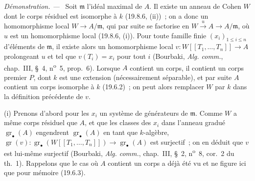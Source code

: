 \documentclass[10pt,oneside]{book}
\newcommand{\gr}{\operatorname{gr}}
\newenvironment{proof}{%
  \par\medskip\noindent\textit{Démonstration. ---\ }}{\par}
\begin{document}
\begin{proof}
Soit $\mathfrak m$ l'idéal maximal de $A$. Il existe un anneau de Cohen $W$ dont
le corps résiduel est isomorphe à $k$ (19.8.6, (ii))~; on a donc un
homomorphisme local $W\to A/\mathfrak m$, qui par suite se factorise en
$W\xrightarrow{u}A\to A/\mathfrak m$, où $u$ est un homomorphisme local
(19.8.6, (i)). Pour toute famille finie $(x_i)_{1\leq i\leq n}$ d'éléments de
$\mathfrak m$, il existe alors un homomorphisme local
$v:W[[T_1,\ldots,T_n]]\to A$ prolongeant $u$ et tel que $v(T_i)=x_i$ pour tout
$i$ (Bourbaki, \emph{Alg. comm.}, chap.~III, §~4, n\textsuperscript{o}~5,
prop.~6). Lorsque $A$ contient un corps, il contient un corps premier $P$, dont
$k$ est une extension (nécessairement séparable), et par suite $A$ contient un
corps isomorphe à $k$ (19.6.2)~; on peut alors remplacer $W$ par $k$ dans la
définition précédente de $v$.

\medskip
\noindent(i)\enspace
Prenons d'abord pour les $x_i$ un système de générateurs de $\mathfrak m$. Comme
$W$ a même corps résiduel que $A$, et que les classes des $x_i$ dans l'anneau
gradué $\gr_\bullet(A)$ engendrent $\gr_\bullet(A)$ en tant que $k$-algèbre,
$\gr(v):\gr_\bullet(W[[T_1,\ldots,T_n]])\to\gr_\bullet(A)$ est surjectif~; on
en déduit que $v$ est lui-même surjectif (Bourbaki, \emph{Alg. comm.},
chap.~III, §~2, n\textsuperscript{o}~8, cor.~2 du th.~1). Rappelons que le cas
où $A$ contient un corps a déjà été vu et ne figure ici que pour mémoire
(19.6.3).


\end{proof}
\end{document}
